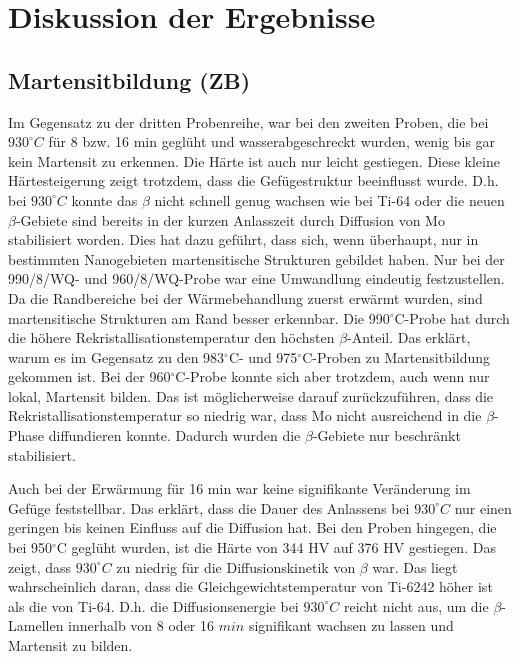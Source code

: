 \chapter{Diskussion der Ergebnisse}

\section{Martensitbildung (ZB)}


Im Gegensatz zu der dritten Probenreihe, war bei den zweiten Proben, die bei $930^\circ C$ für 8 bzw. 16 min geglüht und wasserabgeschreckt wurden, wenig bis gar kein Martensit zu erkennen. Die Härte ist auch nur leicht gestiegen. Diese kleine Härtesteigerung zeigt trotzdem, dass die Gefügestruktur beeinflusst wurde. D.h. bei $930^\circ C$ konnte das $\beta$ nicht schnell genug wachsen wie bei Ti-64 oder die neuen $\beta$-Gebiete sind bereits in der kurzen Anlasszeit durch Diffusion von Mo stabilisiert worden. 
Dies hat dazu geführt, dass sich, wenn überhaupt, nur in bestimmten Nanogebieten martensitische Strukturen gebildet haben. Nur bei der 990/8/WQ- und 960/8/WQ-Probe war eine Umwandlung eindeutig festzustellen. Da die Randbereiche bei der Wärmebehandlung zuerst erwärmt wurden, sind martensitische Strukturen am Rand besser erkennbar.
Die 990$^\circ$C-Probe hat durch die höhere Rekristallisationstemperatur den höchsten $\beta$-Anteil. Das erklärt, warum es im Gegensatz zu den 983$^\circ$C- und 975$^\circ$C-Proben zu Martensitbildung gekommen ist.
Bei der 960$^\circ$C-Probe konnte sich aber trotzdem, auch wenn nur lokal, Martensit bilden. Das ist möglicherweise darauf zurückzuführen, dass die Rekristallisationstemperatur so niedrig war, dass Mo nicht ausreichend in die $\beta$-Phase diffundieren konnte. Dadurch wurden die $\beta$-Gebiete nur beschränkt stabilisiert.

Auch bei der Erwärmung für 16 min war keine signifikante Veränderung im Gefüge feststellbar. Das erklärt, dass die Dauer des Anlassens bei $930^\circ C$ nur einen geringen bis keinen Einfluss auf die Diffusion hat. 
Bei den Proben hingegen, die bei 950$^\circ$C geglüht wurden, ist die Härte von 344 HV auf 376 HV gestiegen. 
Das zeigt, dass $930^\circ C$ zu niedrig für die Diffusionskinetik von $\beta$ war. Das liegt wahrscheinlich daran, dass die Gleichgewichtstemperatur von Ti-6242 höher ist als die von Ti-64. D.h. die Diffusionsenergie bei $930^\circ C$ reicht nicht aus, um die $\beta$-Lamellen innerhalb von 8 oder 16 $min$ signifikant wachsen zu lassen und Martensit zu bilden.

